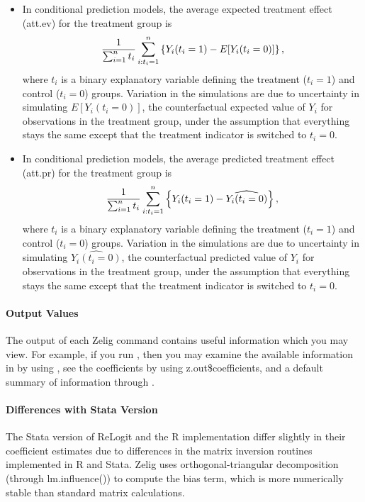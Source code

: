 \documentclass[letterpaper,10pt,english]{sphinxmanual}
\begin{document}
\begin{itemize}
\item {} 
In conditional prediction models, the average expected treatment
effect (att.ev) for the treatment group is
\begin{gather}
\begin{split}\frac{1}{\sum_{i=1}^n t_i}\sum_{i:t_i=1}^n \left\{ Y_i(t_i=1) -
      E[Y_i(t_i=0)] \right\},\end{split}\notag
\end{gather}
where \(t_i\) is a binary explanatory variable defining the
treatment (\(t_i=1\)) and control (\(t_i=0\)) groups.
Variation in the simulations are due to uncertainty in simulating
\(E[Y_i(t_i=0)]\), the counterfactual expected value of
\(Y_i\) for observations in the treatment group, under the
assumption that everything stays the same except that the treatment
indicator is switched to \(t_i=0\).

\item {} 
In conditional prediction models, the average predicted treatment
effect (att.pr) for the treatment group is
\begin{gather}
\begin{split}\frac{1}{\sum_{i=1}^n t_i}\sum_{i:t_i=1}^n \left\{ Y_i(t_i=1) -
      \widehat{Y_i(t_i=0)} \right\},\end{split}\notag
\end{gather}
where \(t_i\) is a binary explanatory variable defining the
treatment (\(t_i=1\)) and control (\(t_i=0\)) groups.
Variation in the simulations are due to uncertainty in simulating
\(\widehat{Y_i(t_i=0)}\), the counterfactual predicted value of
\(Y_i\) for observations in the treatment group, under the
assumption that everything stays the same except that the treatment
indicator is switched to \(t_i=0\).

\end{itemize}


\paragraph{Output Values}
\label{zelig-relogit:output-values}
The output of each Zelig command contains useful information which you
may view. For example, if you run
, then you may examine
the available information in  by using , see
the coefficients by using z.out\$coefficients, and a default summary of
information through .


\paragraph{Differences with Stata Version}
\label{zelig-relogit:differences-with-stata-version}
The Stata version of ReLogit and the R implementation differ slightly in
their coefficient estimates due to differences in the matrix inversion
routines implemented in R and Stata. Zelig uses orthogonal-triangular
decomposition (through lm.influence()) to compute the bias term, which
is more numerically stable than standard matrix calculations.
\end{document}
